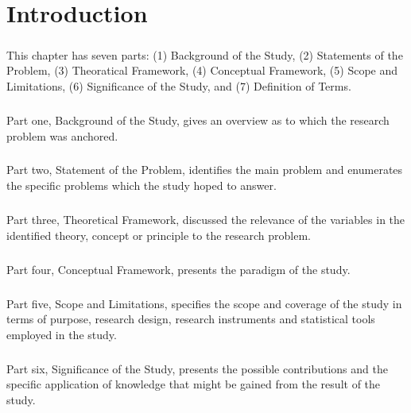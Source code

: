 \chapter{Introduction}

\vspace{-1cm}

\paragraph{} This chapter has seven parts: (1) Background of the Study, (2) Statements of the Problem, (3) Theoratical Framework, 
            (4) Conceptual Framework, (5) Scope and Limitations, (6) Significance of the Study, and (7) Definition of Terms.

\paragraph{} Part one, Background of the Study, gives an overview as to which the research problem was anchored.

\paragraph{} Part two, Statement of the Problem, identifies the main problem and enumerates the specific problems which the study hoped to answer.

\paragraph{} Part three, Theoretical Framework, discussed the relevance of the variables in the identified theory, concept or principle to 
            the research problem.

\paragraph{} Part four, Conceptual Framework, presents the paradigm of the study.

\paragraph{} Part five, Scope and Limitations, specifies the scope and coverage of the study in terms of purpose, research design, 
            research instruments and statistical tools employed in the study.

\paragraph{} Part six, Significance of the Study, presents the possible contributions and the specific application of knowledge that 
            might be gained from the result of the study.

